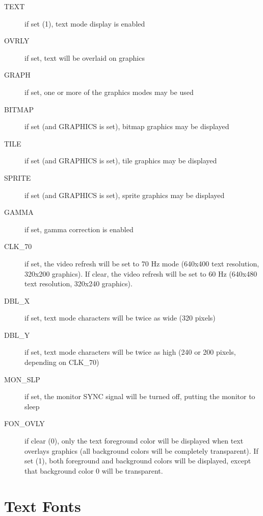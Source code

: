 \begin{description}
    \item[TEXT] if set (1), text mode display is enabled

    \item[OVRLY] if set, text will be overlaid on graphics

    \item[GRAPH] if set, one or more of the graphics modes may be used

    \item[BITMAP] if set (and GRAPHICS is set), bitmap graphics may be displayed

    \item[TILE] if set (and GRAPHICS is set), tile graphics may be displayed

    \item[SPRITE] if set (and GRAPHICS is set), sprite graphics may be displayed

    \item[GAMMA] if set, gamma correction is enabled

    \item[CLK\_70] if set, the video refresh will be set to 70 Hz mode (640x400 text resolution, 320x200 graphics). If clear,
        the video refresh will be set to 60 Hz (640x480 text resolution, 320x240 graphics).

    \item[DBL\_X] if set, text mode characters will be twice as wide (320 pixels)

    \item[DBL\_Y] if set, text mode characters will be twice as high (240 or 200 pixels, depending on CLK\_70)
    
    \item[MON\_SLP] if set, the monitor SYNC signal will be turned off, putting the monitor to sleep
    
    \item[FON\_OVLY] if clear (0), only the text foreground color will be displayed when text overlays graphics (all background colors will be completely transparent). If set (1), both foreground and background colors will be displayed, except that background color 0 will be transparent. 
\end{description}

\section*{Text Fonts}
\label{sec:text_font}

